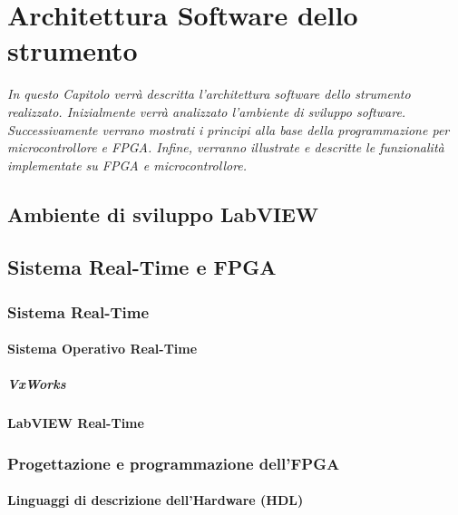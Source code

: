\chapter{Architettura Software dello strumento}
\label{capitolo4}
\thispagestyle{empty}

\textit{In questo Capitolo verrà descritta l’architettura software dello strumento realizzato. Inizialmente verrà analizzato l’ambiente di sviluppo software. Successivamente verrano mostrati i principi alla base della programmazione per microcontrollore e FPGA. Infine, verranno illustrate e descritte le funzionalità implementate su FPGA e microcontrollore.}
\section{Ambiente di sviluppo LabVIEW}

\section{Sistema Real-Time e FPGA}

	\subsection{Sistema Real-Time}

		\subsubsection{Sistema Operativo Real-Time}

			\paragraph{VxWorks}

		\subsubsection{LabVIEW Real-Time}

	\subsection{Progettazione e programmazione dell'FPGA}
		
		\subsubsection{Linguaggi di descrizione dell'Hardware (HDL)}
		
